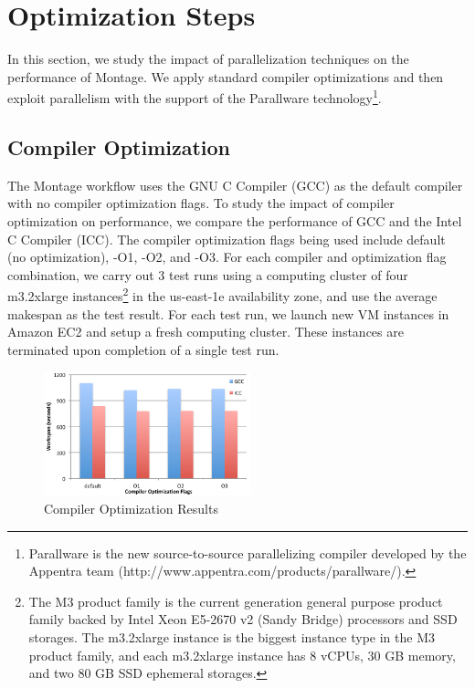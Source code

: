 \section{Optimization Steps}
\label{v1_sec:parallel}

In this section, we study the impact of parallelization techniques on the performance of Montage. We apply standard compiler optimizations and then exploit parallelism with the support of the Parallware technology\footnote{Parallware is the new source-to-source parallelizing compiler developed by the Appentra team  (http://www.appentra.com/products/parallware/).}. 


\subsection{Compiler Optimization}
\label{sec:compiler}

The Montage workflow uses the GNU C Compiler (GCC) as the default compiler with no compiler optimization flags. To study the impact of compiler optimization on performance, we compare the performance of GCC and the Intel C Compiler (ICC). The compiler optimization flags being used include default (no optimization), -O1, -O2, and -O3. For each compiler and optimization flag combination, we carry out 3 test runs using a computing cluster of four m3.2xlarge instances\footnote{The M3 product family is the current generation general purpose product family backed by Intel Xeon E5-2670 v2 (Sandy Bridge) processors and SSD storages. The m3.2xlarge instance is the biggest instance type in the M3 product family, and each m3.2xlarge instance has 8 vCPUs, 30 GB memory, and two 80 GB SSD ephemeral storages.} in the us-east-1e availability zone, and use the average makespan as the test result. For each test run, we launch new VM instances in Amazon EC2 and setup a fresh computing cluster. These instances are terminated upon completion of a single test run. 

\begin{figure}[t!]
\centering
\includegraphics[width=6cm]{fig01}
\vspace{-5pt}
\caption{Compiler Optimization Results}
\vspace{-10pt}
\label{fig:compiler}
\end{figure}


